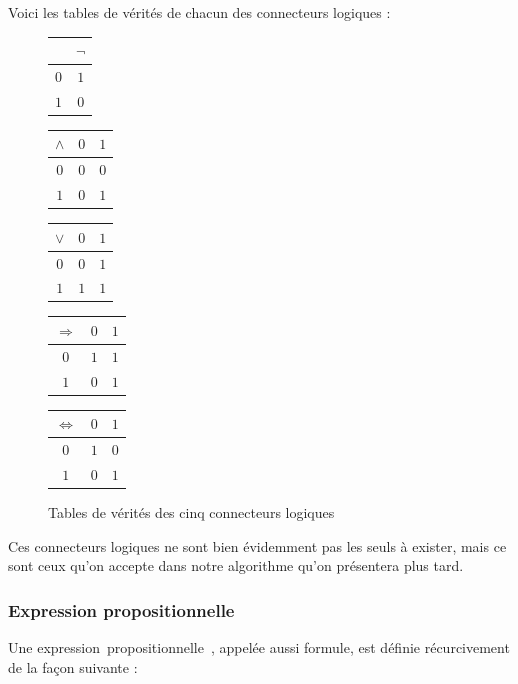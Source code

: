 \documentclass[a4paper, oneside]{report}
\newcommand{\expp}{expression~propositionnelle~}
\begin{document}
Voici les tables de vérités de chacun des connecteurs logiques :
\begin{figure}[h]
\begin{center}
\begin{tabular}[t]{|c|c|}
\hline 
 & $\neg$ \\ 
\hline 
$0$ & $1$\\
$1$ & $0$ \\ 
\hline 
\end{tabular}
\hspace*{1em}
\begin{tabular}[t]{|c|cc|}
\hline 
$\wedge$ & $0$ & $1$ \\ 
\hline 
$0$ & $0$ & $0$\\
$1$ & $0$ & $1$ \\ 
\hline 
\end{tabular}
\hspace*{1em}
\begin{tabular}[t]{|c|cc|}
\hline 
$\vee$ & $0$ & $1$ \\ 
\hline 
$0$ & $0$ & $1$\\
$1$ & $1$ & $1$ \\ 
\hline 
\end{tabular}
\hspace*{1em}
\begin{tabular}[t]{|c|cc|}
\hline 
$\Rightarrow$ & $0$ & $1$ \\ 
\hline 
$0$ & $1$ & $1$\\
$1$ & $0$ & $1$ \\ 
\hline 
\end{tabular}
\hspace*{1em}
\begin{tabular}[t]{|c|cc|}
\hline 
$\Leftrightarrow$ & $0$ & $1$ \\ 
\hline 
$0$ & $1$ & $0$\\
$1$ & $0$ & $1$ \\ 
\hline 
\end{tabular}
\end{center}
\caption{Tables de vérités des cinq connecteurs logiques}
\end{figure}

Ces connecteurs logiques ne sont bien évidemment pas les seuls à exister, mais ce sont ceux qu'on accepte dans notre algorithme qu'on présentera plus tard.

\subsubsection{Expression propositionnelle}
Une \expp, appelée aussi formule, est définie récurcivement de la façon suivante :
\end{document}
